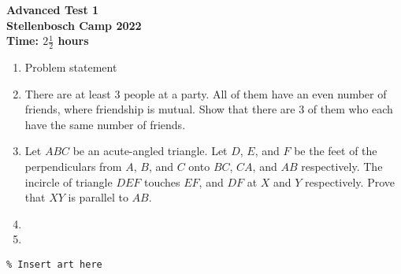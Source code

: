 \documentclass{article}
\begin{document}
\thispagestyle{empty}

\begin{center}
  \textbf{\Large Advanced Test 1}
  \\ \vspace{1em}
  \textbf{\large Stellenbosch Camp 2022}
  \\ \vspace{1em}
  \textbf{\large Time: $2\frac{1}{2}$ hours}
\end{center}

\bigskip

\begin{enumerate}[itemsep=\fill]

\item %
Problem statement


\item %
There are at least 3 people at a party. All of them have an even number of friends, where friendship is mutual. Show that there are 3 of them who each have the same number of friends.


\item %
Let $ABC$ be an acute-angled triangle. Let $D$, $E$, and $F$ be the feet of the perpendiculars from $A$, $B$, and $C$ onto $BC$, $CA$, and $AB$ respectively. The incircle of triangle $DEF$ touches $EF$, and $DF$ at $X$ and $Y$ respectively. Prove that $XY$ is parallel to $AB$.

\item %


\item %


\end{enumerate}


\centering
\small
\begin{BVerbatim}
\end{BVerbatim}
\end{document}
